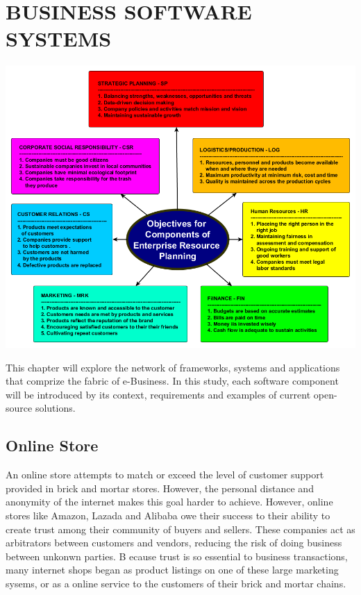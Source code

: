 \documentclass[]{book}
\begin{document}
\hypertarget{business-software-systems}{%
\chapter{BUSINESS SOFTWARE SYSTEMS}\label{business-software-systems}}

\begin{center}\includegraphics[width=0.9\linewidth]{images/ebusiness} \end{center}

This chapter will explore the network of frameworks, systems and applications that comprize the fabric of e-Business. In this study, each software component will be introduced by its context, requirements and examples of current open-source solutions.

\newpage

\hypertarget{online-store}{%
\section{Online Store}\label{online-store}}

An online store attempts to match or exceed the level of customer support provided in brick and mortar stores. However, the personal distance and anonymity of the internet makes this goal harder to achieve. However, online stores like Amazon, Lazada and Alibaba owe their success to their ability to create trust among their community of buyers and sellers. These companies act as arbitrators between customers and vendors, reducing the risk of doing business between unkonwn parties. B ecause trust is so essential to business transactions, many internet shops began as product listings on one of these large marketing sysems, or as a online service to the customers of their brick and mortar chains.
\end{document}

